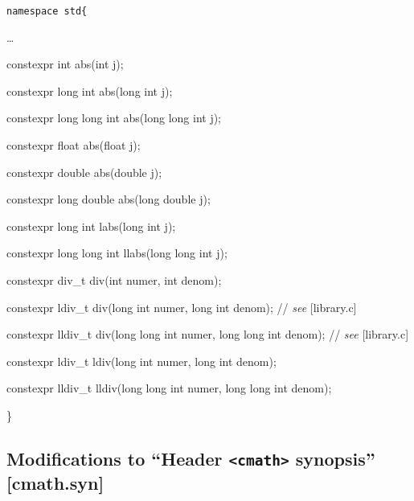 \documentclass[prd,twocolumn,amsmath,amssymb,nofootinbib,eqsecnum]{revtex4-1}
\newcommand{\code}[1]{{\tt #1}}
\newcommand{\header}[1]{{\tt <#1>}}
\newcommand{\highlight}[1]{{\color{red} #1}}
\newcommand{\stdcomment}[1]{{// {\it see} [#1]}}
\begin{document}
\code{namespace std\{

\vspace{2ex}

\ldots

\vspace{2ex}

\highlight{constexpr} int abs(int j);

\highlight{constexpr}  long int abs(long int j);

\highlight{constexpr}  long long int abs(long long int j);

\highlight{constexpr}  float abs(float j);

\highlight{constexpr} double abs(double j);

\highlight{constexpr} long double abs(long double j);

\vspace{2ex}

\highlight{constexpr} long int labs(long int j);

\highlight{constexpr}  long long int llabs(long long int j);

\vspace{2ex}

\highlight{constexpr} div\_t div(int numer, int denom);

\highlight{constexpr} ldiv\_t div(long int numer, long int denom); \stdcomment{library.c}

\highlight{constexpr} lldiv\_t div(long long int numer, long long int denom); \stdcomment{library.c}

\highlight{constexpr} ldiv\_t ldiv(long int numer, long int denom);

\highlight{constexpr} lldiv\_t lldiv(long long int numer, long long int denom);	

\}}

\subsection{Modifications to  ``Header \header{cmath} synopsis'' [cmath.syn]}
\end{document}
